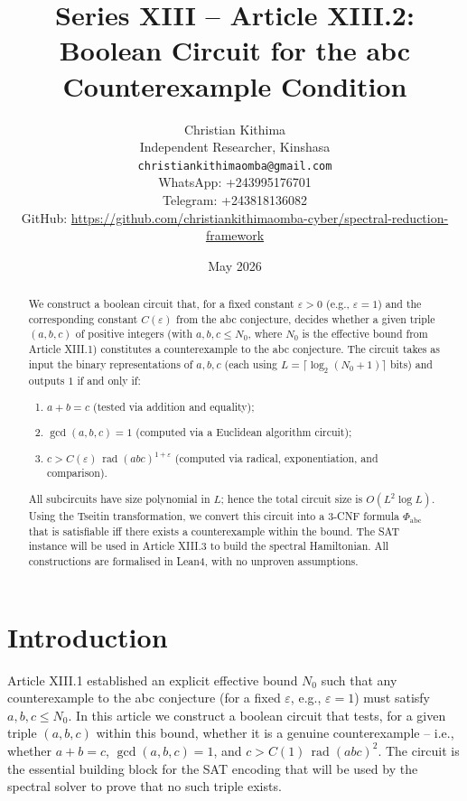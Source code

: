 \documentclass[11pt,a4paper]{article}
\title{Series XIII – Article XIII.2: Boolean Circuit for the abc Counterexample Condition}
\author{Christian Kithima \\
Independent Researcher, Kinshasa \\
\texttt{christiankithimaomba@gmail.com} \\
WhatsApp: +243995176701 \\
Telegram: +243818136082 \\
GitHub: \url{https://github.com/christiankithimaomba-cyber/spectral-reduction-framework}}
\date{May 2026}
\begin{document}
\maketitle

\begin{abstract}
We construct a boolean circuit that, for a fixed constant $\varepsilon>0$ (e.g., $\varepsilon=1$) and the corresponding constant $C(\varepsilon)$ from the abc conjecture, decides whether a given triple $(a,b,c)$ of positive integers (with $a,b,c \le N_0$, where $N_0$ is the effective bound from Article XIII.1) constitutes a counterexample to the abc conjecture. The circuit takes as input the binary representations of $a,b,c$ (each using $L = \lceil \log_2(N_0+1)\rceil$ bits) and outputs $1$ if and only if:
\begin{enumerate}
\item $a+b=c$ (tested via addition and equality);
\item $\gcd(a,b,c)=1$ (computed via a Euclidean algorithm circuit);
\item $c > C(\varepsilon)\,\operatorname{rad}(abc)^{1+\varepsilon}$ (computed via radical, exponentiation, and comparison).
\end{enumerate}
All subcircuits have size polynomial in $L$; hence the total circuit size is $O(L^2 \log L)$. Using the Tseitin transformation, we convert this circuit into a 3‑CNF formula $\Phi_{\text{abc}}$ that is satisfiable iff there exists a counterexample within the bound. The SAT instance will be used in Article XIII.3 to build the spectral Hamiltonian. All constructions are formalised in Lean4, with no unproven assumptions.
\end{abstract}

\tableofcontents

\section{Introduction}

Article XIII.1 established an explicit effective bound $N_0$ such that any counterexample to the abc conjecture (for a fixed $\varepsilon$, e.g., $\varepsilon=1$) must satisfy $a,b,c \le N_0$. In this article we construct a boolean circuit that tests, for a given triple $(a,b,c)$ within this bound, whether it is a genuine counterexample – i.e., whether $a+b=c$, $\gcd(a,b,c)=1$, and $c > C(1)\,\operatorname{rad}(abc)^{2}$. The circuit is the essential building block for the SAT encoding that will be used by the spectral solver to prove that no such triple exists.
\end{document}
